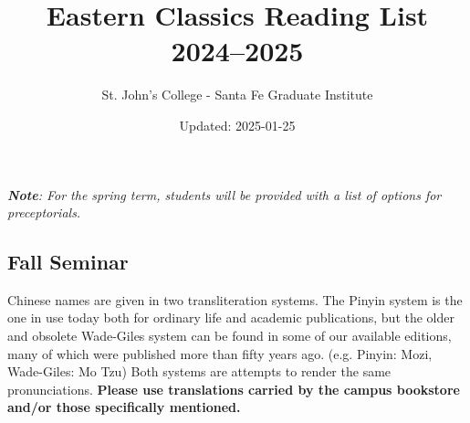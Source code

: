 \documentclass{article}
\title{Eastern Classics Reading List 2024--2025}
\author{St. John's College - Santa Fe Graduate Institute}
\date{Updated: 2025-01-25}
\newcounter{countSemester} %
\begin{document}
\maketitle

\renewcommand*\contentsname{Reading Lists}
\tableofcontents

\vspace{11mm}
\textit{\textbf{Note}: For the spring term, students will be provided with a list of options for preceptorials.}

\thispagestyle{fancy} %



\clearpage

\begin{center}
	\section{Fall Seminar}
\end{center}

Chinese names are given in two transliteration systems.
The Pinyin system is the one in use today both for ordinary life and academic publications, but the older and obsolete Wade-Giles system can be found in some of our available editions, many of which were published more than fifty years ago.
(e.g. Pinyin: Mozi, Wade-Giles: Mo Tzu)
Both systems are attempts to render the same pronunciations.
\textbf{Please use translations carried by the campus bookstore and/or those specifically mentioned.}
\end{document}
